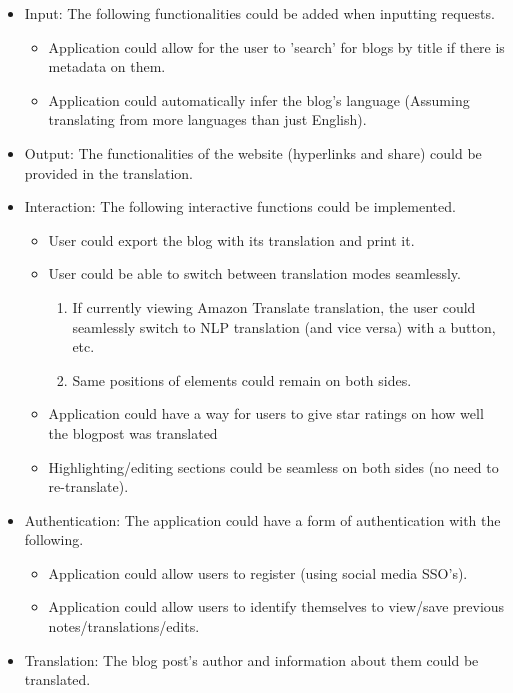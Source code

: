 \begin{itemize}
\item Input: The following functionalities could be added when inputting requests.
\begin{itemize}
\item Application could allow for the user to 'search' for blogs by title if there is metadata on them.
\item Application could automatically infer the blog's language (Assuming translating from more languages than just English).
\end{itemize}
\item Output: The functionalities of the website (hyperlinks and share) could be provided in the translation.
\item Interaction: The following interactive functions could be implemented.
\begin{itemize}
\item User could export the blog with its translation and print it. 
\item User could be able to switch between translation modes seamlessly.
\begin{enumerate}
\item If currently viewing Amazon Translate translation, the user could seamlessly switch to NLP translation (and vice versa) with a button, etc.
\item Same positions of elements could remain on both sides.
\end{enumerate}
\item Application could have a way for users to give star ratings on how well the blogpost was translated
\item Highlighting/editing sections could be seamless on both sides (no need to re-translate).
\end{itemize}
\item Authentication: The application could have a form of authentication with the following.
\begin{itemize}
\item Application could allow users to register (using social media SSO's).
\item Application could allow users to identify themselves to view/save previous notes/translations/edits.
\end{itemize}
\item Translation: The blog post's author and information about them could be translated. 
\end{itemize}

